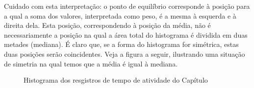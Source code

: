 Cuidado com esta interpretação: o ponto de equilíbrio corresponde à posição para a qual a soma dos valores, interpretada como peso, é a mesma à esquerda e à direita dela. Esta posição, correspondendo à posição da média, não é necessariamente a posição na qual a área total do histograma é dividida em duas metades (mediana). É claro que, se a forma do histograma for simétrica, estas duas posições serão coincidentes. Veja a figura a seguir, ilustrando uma situação de simetria na qual temos que a média é igual à mediana.

\begin{figure}[H]
\centering
\capstart

\noindent{}
\caption{Histograma dos resgistros de tempo de atividade do Capítulo }\label{\detokenize{PE104-1:fig-simetria}}\label{\detokenize{PE104-1:id11}}\end{figure}



